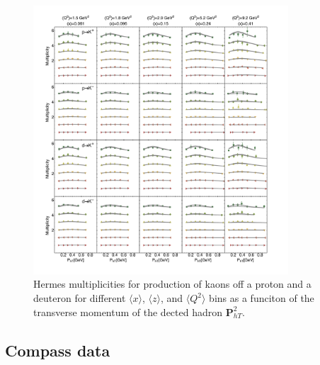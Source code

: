 \documentclass[aps,preprintnumbers,showpacs,nofootinbib,superscriptaddress,floatfix]{revtex4}
\begin{document}
\begin{figure}[h!]
\begin{center}
\includegraphics[width=0.85\textwidth]{plots/Hermes/Hermes_Kaons_SCIplot_flINDEP.pdf}
\end{center}
\caption{Hermes multiplicities for production of kaons off a proton and a deuteron for different $\langle x \rangle$, $\langle z \rangle$, and $\langle Q^2 \rangle$ bins as a funciton of the transverse momentum of the dected hadron ${\bm P}_{hT}^ 2$.} 
\label{f:H_kaons}
\end{figure}


\subsection{Compass data}
\label{ss:compass}
\end{document}
